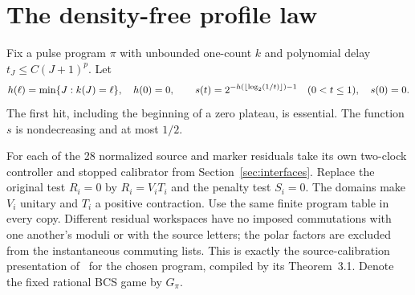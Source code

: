 \section{The density-free profile law}\label{sec:profiles}
Fix a pulse program $\pi$ with unbounded one-count $k$ and polynomial delay $t_J\le C(J+1)^p$. Let
\[
 h(\ell)=\min\{J:k(J)=\ell\},\quad h(0)=0,\qquad
 s(t)=2^{-h(\lfloor\log_2(1/t)\rfloor)-1}\quad(0<t\le1),
 \quad s(0)=0.
\]
The first hit, including the beginning of a zero plateau, is essential. The function $s$ is nondecreasing and at most $1/2$.

For each of the 28 normalized source and marker residuals take its own two-clock controller and stopped calibrator from Section~\ref{sec:interfaces}. Replace the original test $R_i=0$ by $R_i=V_iT_i$ and the penalty test $S_i=0$. The domains make $V_i$ unitary and $T_i$ a positive contraction. Use the same finite program table in every copy. Different residual workspaces have no imposed commutations with one another's moduli or with the source letters; the polar factors are excluded from the instantaneous commuting lists. This is exactly the source-calibration presentation of~\cite[Section P5]{UP} for the chosen program, compiled by its Theorem~3.1. Denote the fixed rational BCS game by $G_\pi$.

